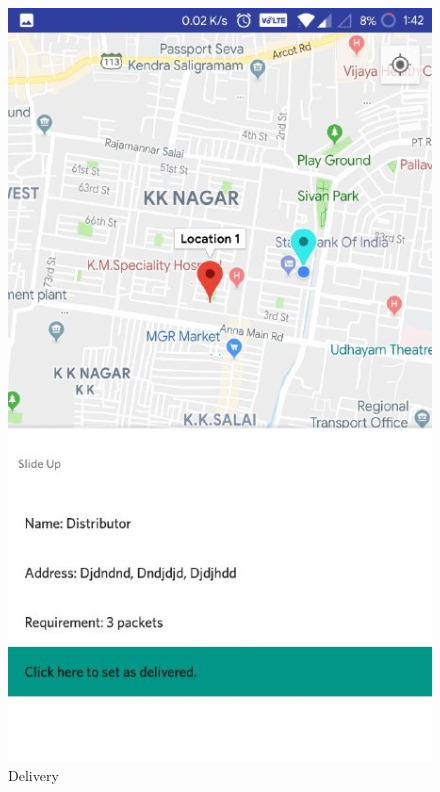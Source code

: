 \begin{figure}[h]
  \begin{center}
\includegraphics[scale=0.6]{3/twelve.jpeg}
\caption{Delivery }
\label{fig:two}
\end{center}
\end{figure}

